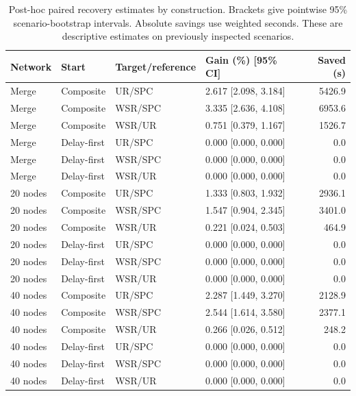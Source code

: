 \begin{table}[!htbp]
\caption{Post-hoc paired recovery estimates by construction. Brackets give pointwise 95\% scenario-bootstrap intervals. Absolute savings use weighted seconds. These are descriptive estimates on previously inspected scenarios.}\label{tab:construction-recovery-full}
\centering\small
\begin{tabularx}{\textwidth}{l l l L r}
\toprule Network & Start & Target/reference & Gain (\%) [95\% CI] & Saved (s)\\\midrule
Merge & Composite & UR/SPC & 2.617 [2.098, 3.184] & 5426.9\\
Merge & Composite & WSR/SPC & 3.335 [2.636, 4.108] & 6953.6\\
Merge & Composite & WSR/UR & 0.751 [0.379, 1.167] & 1526.7\\
Merge & Delay-first & UR/SPC & 0.000 [0.000, 0.000] & 0.0\\
Merge & Delay-first & WSR/SPC & 0.000 [0.000, 0.000] & 0.0\\
Merge & Delay-first & WSR/UR & 0.000 [0.000, 0.000] & 0.0\\
20 nodes & Composite & UR/SPC & 1.333 [0.803, 1.932] & 2936.1\\
20 nodes & Composite & WSR/SPC & 1.547 [0.904, 2.345] & 3401.0\\
20 nodes & Composite & WSR/UR & 0.221 [0.024, 0.503] & 464.9\\
20 nodes & Delay-first & UR/SPC & 0.000 [0.000, 0.000] & 0.0\\
20 nodes & Delay-first & WSR/SPC & 0.000 [0.000, 0.000] & 0.0\\
20 nodes & Delay-first & WSR/UR & 0.000 [0.000, 0.000] & 0.0\\
40 nodes & Composite & UR/SPC & 2.287 [1.449, 3.270] & 2128.9\\
40 nodes & Composite & WSR/SPC & 2.544 [1.614, 3.580] & 2377.1\\
40 nodes & Composite & WSR/UR & 0.266 [0.026, 0.512] & 248.2\\
40 nodes & Delay-first & UR/SPC & 0.000 [0.000, 0.000] & 0.0\\
40 nodes & Delay-first & WSR/SPC & 0.000 [0.000, 0.000] & 0.0\\
40 nodes & Delay-first & WSR/UR & 0.000 [0.000, 0.000] & 0.0\\
\bottomrule
\end{tabularx}
\end{table}
